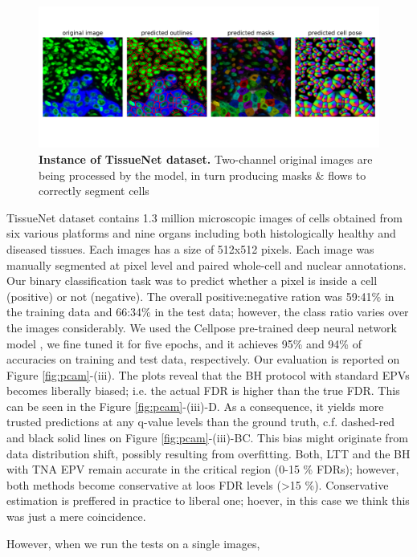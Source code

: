 \documentclass{article}
\begin{document}
\begin{figure}
    \centering
	\includegraphics[width=5in]{img/tissuenet.pdf}
	\caption{{\bf Instance of TissueNet dataset.} Two-channel original images are being processed by the model, in turn producing masks \& flows to correctly segment cells}
	\label{fig:tissue_example}
\end{figure} 

TissueNet dataset contains 1.3 million microscopic images of cells obtained from six various platforms and nine organs including both histologically healthy and diseased tissues. Each images has a size of 512x512 pixels. Each image was manually segmented at pixel level and paired whole-cell and nuclear annotations. Our binary classification task was to predict whether a pixel is inside a cell (positive) or not (negative). The overall positive:negative ration was 59:41\% in the training data and 66:34\% in the test data; however, the class ratio varies over the images considerably. We used the Cellpose pre-trained deep neural network model \cite{cellpose}, we fine tuned it for five epochs, and it achieves 95\% and 94\% of accuracies  on training and test data, respectively. Our evaluation is reported on Figure \ref{fig:pcam}-(iii). The plots reveal that the BH protocol with standard EPVs becomes liberally biased; i.e. the actual FDR is higher than the true FDR. This can be seen in the Figure  \ref{fig:pcam}-(iii)-D. As a consequence, it yields more trusted predictions at any q-value levels than the ground truth, c.f. dashed-red and black solid lines on Figure \ref{fig:pcam}-(iii)-BC. This bias might originate from data distribution shift, possibly resulting from overfitting. Both, LTT and the BH with TNA EPV remain accurate in the critical region (0-15 \% FDRs); however, both methods become conservative  at loos FDR levels (>15 \%). Conservative estimation is preffered in practice to liberal one; hoever, in this case we think this was just a mere coincidence. 

However, when we run the tests on a single images, 
%
%
\end{document}
